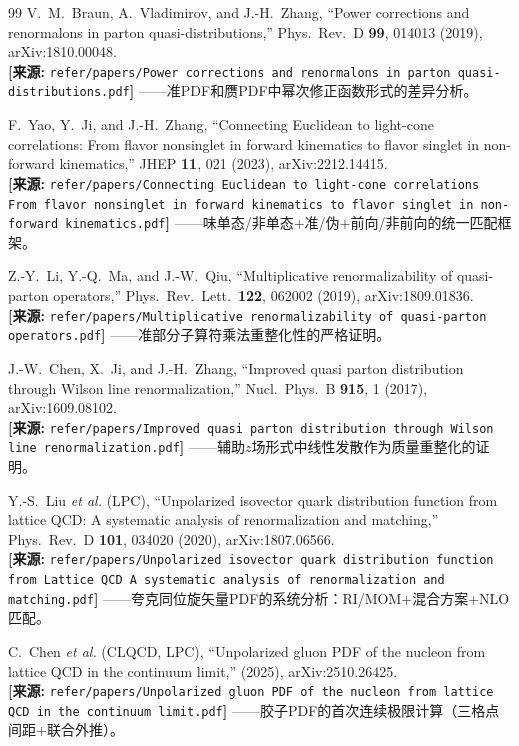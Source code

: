 \documentclass[12pt,a4paper]{ctexart}
\theoremstyle{definition}
\begin{document}
\begin{thebibliography}{99}
V.~M.~Braun, A.~Vladimirov, and J.-H.~Zhang,
``Power corrections and renormalons in parton quasi-distributions,''
Phys.\ Rev.\ D \textbf{99}, 014013 (2019), arXiv:1810.00048.
\\\textbf{[来源:} \texttt{refer/papers/Power corrections and renormalons in parton quasi-distributions.pdf}\textbf{]}
——准PDF和赝PDF中幂次修正函数形式的差异分析。

F.~Yao, Y.~Ji, and J.-H.~Zhang,
``Connecting Euclidean to light-cone correlations: From flavor nonsinglet in forward kinematics to flavor singlet in non-forward kinematics,''
JHEP \textbf{11}, 021 (2023), arXiv:2212.14415.
\\\textbf{[来源:} \texttt{refer/papers/Connecting Euclidean to light-cone correlations From flavor nonsinglet in forward kinematics to flavor singlet in non-forward kinematics.pdf}\textbf{]}
——味单态/非单态+准/伪+前向/非前向的统一匹配框架。

Z.-Y.~Li, Y.-Q.~Ma, and J.-W.~Qiu,
``Multiplicative renormalizability of quasi-parton operators,''
Phys.\ Rev.\ Lett.\ \textbf{122}, 062002 (2019), arXiv:1809.01836.
\\\textbf{[来源:} \texttt{refer/papers/Multiplicative renormalizability of quasi-parton operators.pdf}\textbf{]}
——准部分子算符乘法重整化性的严格证明。

J.-W.~Chen, X.~Ji, and J.-H.~Zhang,
``Improved quasi parton distribution through Wilson line renormalization,''
Nucl.\ Phys.\ B \textbf{915}, 1 (2017), arXiv:1609.08102.
\\\textbf{[来源:} \texttt{refer/papers/Improved quasi parton distribution through Wilson line renormalization.pdf}\textbf{]}
——辅助$z$场形式中线性发散作为质量重整化的证明。

Y.-S.~Liu \textit{et al.} (LPC),
``Unpolarized isovector quark distribution function from lattice QCD: A systematic analysis of renormalization and matching,''
Phys.\ Rev.\ D \textbf{101}, 034020 (2020), arXiv:1807.06566.
\\\textbf{[来源:} \texttt{refer/papers/Unpolarized isovector quark distribution function from Lattice QCD A systematic analysis of renormalization and matching.pdf}\textbf{]}
——夸克同位旋矢量PDF的系统分析：RI/MOM+混合方案+NLO匹配。

C.~Chen \textit{et al.} (CLQCD, LPC),
``Unpolarized gluon PDF of the nucleon from lattice QCD in the continuum limit,''
(2025), arXiv:2510.26425.
\\\textbf{[来源:} \texttt{refer/papers/Unpolarized gluon PDF of the nucleon from lattice QCD in the continuum limit.pdf}\textbf{]}
——胶子PDF的首次连续极限计算（三格点间距+联合外推）。


\end{thebibliography}
\end{document}

